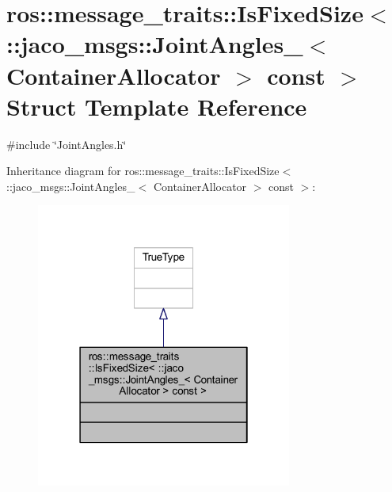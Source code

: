\hypertarget{structros_1_1message__traits_1_1IsFixedSize_3_01_1_1jaco__msgs_1_1JointAngles___3_01ContainerAllocator_01_4_01const_01_01_4}{}\section{ros\+:\+:message\+\_\+traits\+:\+:Is\+Fixed\+Size$<$ \+:\+:jaco\+\_\+msgs\+:\+:Joint\+Angles\+\_\+$<$ Container\+Allocator $>$ const $>$ Struct Template Reference}
\label{structros_1_1message__traits_1_1IsFixedSize_3_01_1_1jaco__msgs_1_1JointAngles___3_01ContainerAllocator_01_4_01const_01_01_4}


{\ttfamily \#include \char`\"{}Joint\+Angles.\+h\char`\"{}}



Inheritance diagram for ros\+:\+:message\+\_\+traits\+:\+:Is\+Fixed\+Size$<$ \+:\+:jaco\+\_\+msgs\+:\+:Joint\+Angles\+\_\+$<$ Container\+Allocator $>$ const $>$\+:
\nopagebreak
\begin{figure}[H]
\begin{center}
\leavevmode
\includegraphics[width=238pt]{dd/db4/structros_1_1message__traits_1_1IsFixedSize_3_01_1_1jaco__msgs_1_1JointAngles___3_01ContainerAll682e313603443eb1aee9dee5f9e2989b}
\end{center}
\end{figure}


